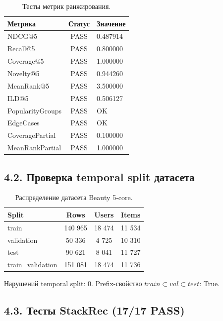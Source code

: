 \documentclass[11pt,a4paper]{article}
\begin{document}
\begin{table}[H]
\centering
\begin{tabular}{lcl}
\toprule
Метрика & Статус & Значение \\
\midrule
NDCG@5 & PASS & 0.487914 \\
Recall@5 & PASS & 0.800000 \\
Coverage@5 & PASS & 1.000000 \\
Novelty@5 & PASS & 0.944260 \\
MeanRank@5 & PASS & 3.500000 \\
ILD@5 & PASS & 0.506127 \\
PopularityGroups & PASS & OK \\
EdgeCases & PASS & OK \\
CoveragePartial & PASS & 0.100000 \\
MeanRankPartial & PASS & 1.000000 \\
\bottomrule
\end{tabular}
\caption{Тесты метрик ранжирования.}
\end{table}

\subsection*{4.2. Проверка temporal split датасета}

\begin{table}[H]
\centering
\begin{tabular}{lccc}
\toprule
Split & Rows & Users & Items \\
\midrule
train & 140 965 & 18 474 & 11 534 \\
validation & 50 336 & 4 725 & 10 310 \\
test & 90 621 & 8 041 & 11 727 \\
train\_validation & 151 081 & 18 474 & 11 736 \\
\bottomrule
\end{tabular}
\caption{Распределение датасета Beauty 5-core.}
\end{table}

Нарушений temporal split: 0. Prefix-свойство $train \subset val \subset test$: True.

\subsection*{4.3. Тесты StackRec (17/17 PASS)}
\end{document}
